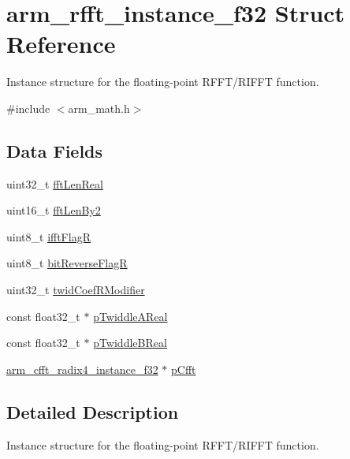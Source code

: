 \hypertarget{structarm__rfft__instance__f32}{}\section{arm\+\_\+rfft\+\_\+instance\+\_\+f32 Struct Reference}
\label{structarm__rfft__instance__f32}


Instance structure for the floating-\/point R\+F\+F\+T/\+R\+I\+F\+FT function.  




{\ttfamily \#include $<$arm\+\_\+math.\+h$>$}

\subsection*{Data Fields}
\begin{DoxyCompactItemize}
\item 
uint32\+\_\+t \mbox{\hyperlink{structarm__rfft__instance__f32_adf0d4604cf5546075d9d4cf122d6c986}{fft\+Len\+Real}}
\item 
uint16\+\_\+t \mbox{\hyperlink{structarm__rfft__instance__f32_a206b7cd92c35fde3432e5b9a0650c42c}{fft\+Len\+By2}}
\item 
uint8\+\_\+t \mbox{\hyperlink{structarm__rfft__instance__f32_a787d72055c89e4d62b188d6bd646341c}{ifft\+FlagR}}
\item 
uint8\+\_\+t \mbox{\hyperlink{structarm__rfft__instance__f32_ad56ec2425e2422108b8767b43d944591}{bit\+Reverse\+FlagR}}
\item 
uint32\+\_\+t \mbox{\hyperlink{structarm__rfft__instance__f32_a5b06f7f76c018db993fe6acc5708c589}{twid\+Coef\+R\+Modifier}}
\item 
const float32\+\_\+t $\ast$ \mbox{\hyperlink{structarm__rfft__instance__f32_a9242c2e59819701cb99429b0dc9f3796}{p\+Twiddle\+A\+Real}}
\item 
const float32\+\_\+t $\ast$ \mbox{\hyperlink{structarm__rfft__instance__f32_a5cebe2c6994199d1c89a87105f8b4351}{p\+Twiddle\+B\+Real}}
\item 
\mbox{\hyperlink{structarm__cfft__radix4__instance__f32}{arm\+\_\+cfft\+\_\+radix4\+\_\+instance\+\_\+f32}} $\ast$ \mbox{\hyperlink{structarm__rfft__instance__f32_ab7bd4d374a1780dea50efd3e7ac220be}{p\+Cfft}}
\end{DoxyCompactItemize}


\subsection{Detailed Description}
Instance structure for the floating-\/point R\+F\+F\+T/\+R\+I\+F\+FT function. 

